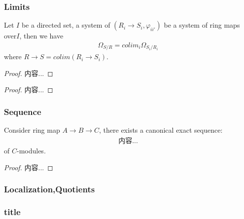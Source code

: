 \documentclass[Total.tex]{subfiles}
\begin{document}
		\subsubsection{Limits}
			\begin{lemma}
				Let $I$ be a directed set, a system of $(R_i\rightarrow S_i,\varphi_{ii'})$ be a system of ring maps over$I$, then we have
				\begin{gather*}
					\Omega_{S/R}=colim_i \Omega_{S_i/R_i}
				\end{gather*}
				where $R\rightarrow S=colim(R_i\rightarrow S_i)$.
			\end{lemma}
			\begin{proof}
				内容...
			\end{proof}
			
			\begin{lemma}
				
			\end{lemma}
			\begin{proof}
				内容...
			\end{proof}
		\subsubsection{Sequence}
			\begin{proposition}
				Consider ring map $A\rightarrow B\rightarrow C$, there exists a canonical exact sequence:
				\begin{gather*}
					内容...
				\end{gather*}
				of $C$-modules.
			\end{proposition}
			\begin{proof}
				内容...
			\end{proof}
		\subsubsection{Localization,Quotients}
		\subsubsection{title}
		
\end{document}
